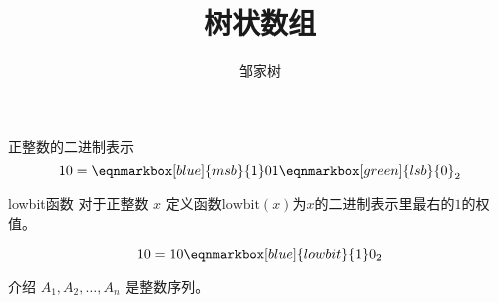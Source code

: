 \documentclass{ctexbeamer}
\title{树状数组}
\author{邹家树}
\newcommand{\lb}{\mathrm{lowbit}}
\begin{document}
\maketitle

\begin{frame}{正整数的二进制表示}
\begin{equation*}
10 =
\eqnmarkbox[blue]{msb}{1}
0
1
\eqnmarkbox[green]{lsb}{0}_2
\end{equation*}




\end{frame}

\begin{frame}{lowbit函数}
对于正整数 $x$ 定义函数$\lb(x)$为$x$的二进制表示里最右的$1$的权值。

\begin{equation*}
10 =
1
0
\eqnmarkbox[blue]{lowbit}{1}
0_2
\end{equation*}


\end{frame}


\begin{frame}{介绍}
$A_1, A_2, \dots, A_n$ 是整数序列。
\end{frame}
\end{document}
